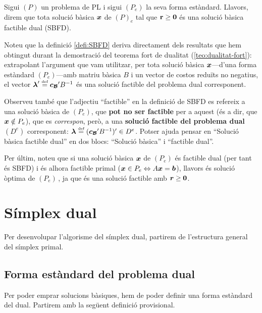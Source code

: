 \begin{defi}\label{defi:SBFD}
	Sigui $\left(P\right)$ un problema de PL i sigui $(P_e)$ la seva forma
	estàndard. Llavors, direm que tota solució bàsica $\boldsymbol{x}$ de 
	$\left(P\right)_e$
	tal que $\mathbf{r} \geq \boldsymbol{0}$ és una solució bàsica factible dual (SBFD).
\end{defi}

Noteu que la definició \ref{defi:SBFD} deriva directament dels resultats que hem
obtingut durant la demostració del teorema fort de dualitat
(\ref{teo:dualitat-fort}): extrapolant l'argument que vam utilitzar, per tota
solució bàsica $\boldsymbol{x}$---d'una forma estàndard $(P_e)$---amb matriu bàsica $B$
i un vector de costos reduïts no negatius, el vector $\boldsymbol{\lambda}' \stackrel{\text{\tiny def}}{=}
\boldsymbol{c_{\mathcal{B}}}' B^{-1}$ és una solució factible del problema dual corresponent.

Observeu també que l'adjectiu ``factible'' en la definició de SBFD es refereix a
una solució bàsica de $(P_e)$, que \textbf{pot no ser factible} per a aquest (és
a dir, que $\boldsymbol{x}\notin P_e$), que es \textit{correspon}, però, a una
\textbf{solució factible del problema dual} $(D^e)$ corresponent: $\boldsymbol{\lambda}
\stackrel{\text{\tiny def}}{=} (\boldsymbol{c_{\mathcal{B}}}' B^{-1})' \in D^e$. Potser ajuda pensar en ``Solució bàsica
factible dual'' en dos blocs: ``Solució bàsica'' i ``factible dual''.

Per últim, noteu que si una solució bàsica $\boldsymbol{x}$ de $(P_e)$ és factible dual
(per tant és SBFD) i és alhora factible primal ($\boldsymbol{x} \in P_e \Leftrightarrow
A\boldsymbol{x} = \boldsymbol{b}$), llavors és solució òptima de $(P_e)\,$, ja que és una
solució factible amb $\boldsymbol{r}\ge \boldsymbol{0}$.


\section{Símplex dual}

Per desenvolupar l'algorisme del símplex dual, partirem de l'estructura general 
del símplex primal. 


\subsection{Forma estàndard del problema dual}
Per poder emprar solucions bàsiques, hem de poder definir una forma estàndard 
del dual. Partirem amb la següent definició provisional.

